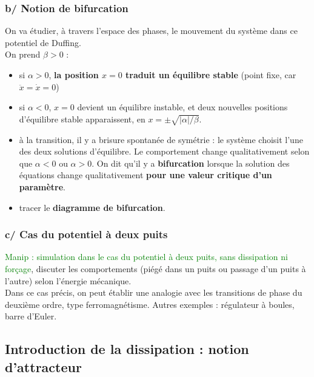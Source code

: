 \documentclass[11pt,a4paper]{report}
\begin{document}
\subsubsection*{b/ Notion de bifurcation}

On va étudier, à travers l'espace des phases, le mouvement du système dans ce potentiel de Duffing.\\

On prend $\beta > 0$ :
\begin{itemize}
	\item si $\alpha > 0$, \textbf{la position $x = 0$ 
		traduit un équilibre stable} (point fixe, car $\ddot{x} = \dot{x} = 0$)\\
	\item si $\alpha < 0$, $x = 0$ devient un équilibre instable, et deux nouvelles 
	positions d'équilibre stable apparaissent, en $x = \pm \sqrt{|\alpha|/\beta}$.\\
	\item à la transition, il y a brisure spontanée de symétrie : le système choisit l'une des 			deux solutions d'équilibre. Le comportement change qualitativement selon que 
		$\alpha < 0$ ou $\alpha > 0$. On dit qu'il y a \textbf{bifurcation} lorsque la solution 		des équations change qualitativement \textbf{pour une valeur critique d'un 
		paramètre}.\\
	\item tracer le \textbf{diagramme de bifurcation}.\\
\end{itemize}

\subsubsection*{c/ Cas du potentiel à deux puits}
\textcolor{green}{Manip : simulation dans le cas du potentiel à deux puits, sans dissipation ni forçage}, discuter les comportements (piégé dans un puits ou passage d'un puits à l'autre) selon l'énergie mécanique.\\

Dans ce cas précis, on peut établir une analogie avec les transitions de phase du deuxième ordre, type ferromagnétisme. Autres exemples : régulateur à boules, barre d'Euler.\\


\subsection{Introduction de la dissipation : notion d'attracteur}
\end{document}
